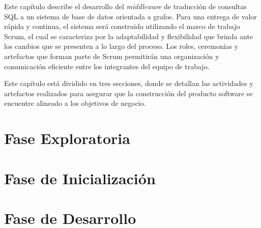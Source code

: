 Este capítulo describe el desarrollo del \textit{middleware} de traducción de consultas SQL a un sistema de base de datos orientada a grafos. Para una entrega de valor rápida y continua, el sistema será construido utilizando el marco de trabajo Scrum, el cual se caracteriza por la adaptabilidad y flexibilidad que brinda ante los cambios que se presenten a lo largo del proceso. Los roles, ceremonias y artefactos que forman parte de Scrum permitirán una organización y comunicación eficiente entre los integrantes del equipo de trabajo.

Este capítulo está dividido en tres secciones, donde se detallan las actividades y artefactos realizados para asegurar que la construcción del producto software se encuentre alineado a los objetivos de negocio.

\section{Fase Exploratoria}
\label{chapter02-section01:Fase Exploratoria}


\section{Fase de Inicialización}
\label{chapter02-section02:Fase Inicialización}


\section{Fase de Desarrollo}
\label{chapter02-section03:Fase De Desarrollo}




